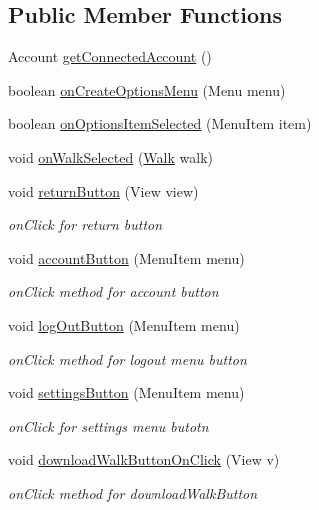 \subsection*{Public Member Functions}
\begin{DoxyCompactItemize}
\item 
Account \hyperlink{classuk_1_1ac_1_1swan_1_1digitaltrails_1_1activities_1_1_search_activity_a371736b22ebe98f1dbb1d3080c08988c}{get\+Connected\+Account} ()
\item 
boolean \hyperlink{classuk_1_1ac_1_1swan_1_1digitaltrails_1_1activities_1_1_search_activity_aeb26eabe642e7fd5f72c7772ebfc25fb}{on\+Create\+Options\+Menu} (Menu menu)
\item 
boolean \hyperlink{classuk_1_1ac_1_1swan_1_1digitaltrails_1_1activities_1_1_search_activity_af619c1fe31adeeccfc68137bde8d1e30}{on\+Options\+Item\+Selected} (Menu\+Item item)
\item 
void \hyperlink{classuk_1_1ac_1_1swan_1_1digitaltrails_1_1activities_1_1_search_activity_a5d9e0e94d81c77f7615dfc12835cc313}{on\+Walk\+Selected} (\hyperlink{classuk_1_1ac_1_1swan_1_1digitaltrails_1_1components_1_1_walk}{Walk} walk)
\item 
void \hyperlink{classuk_1_1ac_1_1swan_1_1digitaltrails_1_1activities_1_1_search_activity_a3e7b13bd7d42ec0820a25399d725437f}{return\+Button} (View view)
\begin{DoxyCompactList}\small\item\em on\+Click for return button \end{DoxyCompactList}\item 
void \hyperlink{classuk_1_1ac_1_1swan_1_1digitaltrails_1_1activities_1_1_search_activity_a5cabca269211687adbc5afab71910a46}{account\+Button} (Menu\+Item menu)
\begin{DoxyCompactList}\small\item\em on\+Click method for account button \end{DoxyCompactList}\item 
void \hyperlink{classuk_1_1ac_1_1swan_1_1digitaltrails_1_1activities_1_1_search_activity_a82fb75ae4a7490a4f27c22836165051e}{log\+Out\+Button} (Menu\+Item menu)
\begin{DoxyCompactList}\small\item\em on\+Click method for logout menu button \end{DoxyCompactList}\item 
void \hyperlink{classuk_1_1ac_1_1swan_1_1digitaltrails_1_1activities_1_1_search_activity_ad7228d41a7983d027ebabf006fe899db}{settings\+Button} (Menu\+Item menu)
\begin{DoxyCompactList}\small\item\em on\+Click for settings menu butotn \end{DoxyCompactList}\item 
void \hyperlink{classuk_1_1ac_1_1swan_1_1digitaltrails_1_1activities_1_1_search_activity_ac14fb19b105ccc48dd57066e7c8cf986}{download\+Walk\+Button\+On\+Click} (View v)
\begin{DoxyCompactList}\small\item\em on\+Click method for download\+Walk\+Button \end{DoxyCompactList}\end{DoxyCompactItemize}

